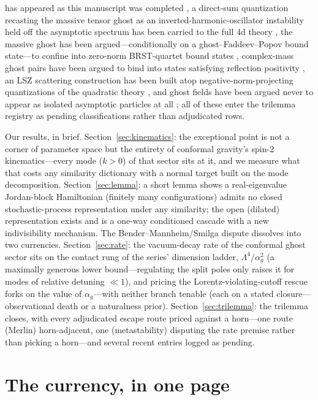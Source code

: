 \documentclass[11pt]{article}
\theoremstyle{definition}
\theoremstyle{remark}
\newcommand{\ag}{\alpha_g}
\begin{document}
has appeared as this manuscript was completed
\cite{BatemanTurok2026}, a direct-sum quantization recasting
the massive tensor ghost as an inverted-harmonic-oscillator
instability held off the asymptotic spectrum has been carried to
the full 4d theory \cite{KumarMarto2026}, the massive ghost
has been argued---conditionally on a ghost--Faddeev--Popov bound
state---to confine into zero-norm BRST-quartet bound
states \cite{Oda2026}, complex-mass ghost pairs have been
argued to bind into states satisfying reflection positivity
\cite{AsoreyKPS2026}, an LSZ scattering construction has been
built atop negative-norm-projecting quantizations of the
quadratic theory \cite{Santillan2025}, and ghost fields have
been argued never to appear as isolated asymptotic particles at
all \cite{Buoninfante2026}; all of these enter the
trilemma registry as pending classifications rather than
adjudicated rows.

Our results, in brief. Section~\ref{sec:kinematics}: the exceptional
point is not a corner of parameter space but the entirety of
conformal gravity's spin-2 kinematics---every mode ($k>0$) of that sector
sits at it, and we
measure what that costs any similarity dictionary with a normal target built on the mode decomposition.
Section~\ref{sec:lemma}: a short lemma shows a real-eigenvalue
Jordan-block
Hamiltonian (finitely many configurations) admits no closed stochastic-process representation under
any similarity; the open (dilated) representation exists and is a
one-way conditioned cascade with a new indivisibility mechanism. The
Bender--Mannheim/Smilga dispute dissolves into two currencies.
Section~\ref{sec:rate}: the vacuum-decay rate of the conformal ghost
sector sits on the contact rung of the series' dimension ladder,
$\Lambda^{4}/\ag^{2}$ (a maximally generous lower bound---regulating the
split poles only raises it for modes of relative detuning $\ll1$), and pricing the Lorentz-violating-cutoff
rescue forks on the value of $\ag$---with neither branch tenable (each on a stated closure---observational death or a naturalness prior).
Section~\ref{sec:trilemma}: the trilemma closes, with every
adjudicated escape route priced against a horn---one route (Merlin)
horn-adjacent, one (metastability) disputing the rate premise rather
than picking a horn---and several recent entries logged as pending.

\section{The currency, in one page}
\label{sec:currency}
\end{document}
